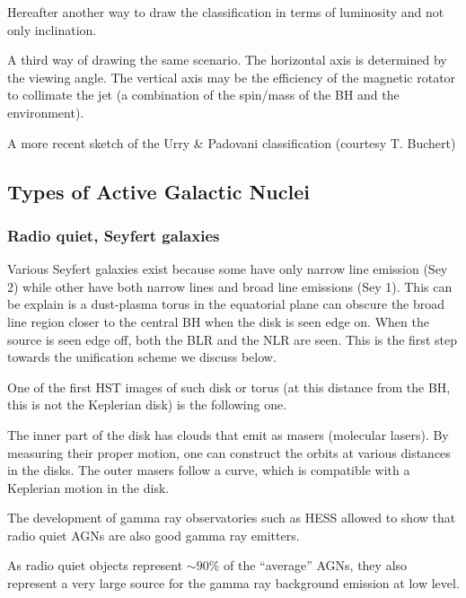 \documentclass[10pt,a4paper,english]{article}
\begin{document}
Hereafter another way to draw the classification in terms of luminosity and not only inclination.

A third way of drawing the same scenario. The horizontal axis is determined by the viewing angle. The vertical axis may be the efficiency of the magnetic rotator to collimate the jet (a combination of the spin/mass of the BH and the environment).


A more recent sketch of the Urry \& Padovani classification (courtesy T. Buchert)
\subsection{Types of Active Galactic Nuclei}
\subsubsection{Radio quiet, Seyfert galaxies}

Various Seyfert galaxies exist because some have only narrow line
emission (Sey 2) while other have both narrow lines and broad line
emissions (Sey 1). This can be explain is a dust-plasma torus in the
equatorial plane can obscure the broad line region closer to the
central BH when the disk is seen edge on. When the source is seen edge
off, both the BLR and the NLR are seen. This is the first step towards
the unification scheme we discuss below.

One of the first HST images of such disk or torus (at this distance
from the BH, this is not the Keplerian disk) is the following one.

The inner part of the disk has  clouds that emit as masers
(molecular lasers). By measuring their proper motion, one can
construct the orbits at various distances in the disks. The outer
masers follow a curve, which is compatible with a Keplerian motion in
the disk.

The development of gamma ray observatories such as HESS allowed to show that radio quiet AGNs are also good gamma ray emitters.


As radio quiet objects represent $\sim 90\%$ of the ``average'' AGNs, they also represent a very large source for the gamma ray background emission at low level.
\end{document}
